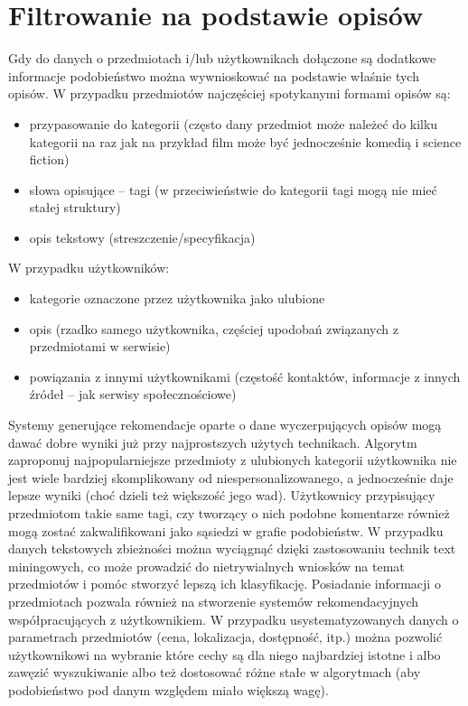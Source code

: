 \documentclass{pracamgr}
\begin{document}
  \section{Filtrowanie na podstawie opisów}
   Gdy do danych o przedmiotach i/lub użytkownikach dołączone są dodatkowe informacje podobieństwo
   można wywnioskować na podstawie właśnie tych opisów.\newline
   W przypadku przedmiotów najczęściej spotykanymi formami opisów są:
   \begin{itemize}\itemsep1pt \parskip0pt 
    \item przypasowanie do kategorii
     (często dany przedmiot może należeć do kilku kategorii na raz jak na przykład film może być jednocześnie komedią i science fiction)
    \item słowa opisujące -- tagi (w przeciwieństwie do kategorii tagi mogą nie mieć stałej struktury)
    \item opis tekstowy (streszczenie/specyfikacja)
   \end{itemize}
   W przypadku użytkowników:
   \begin{itemize}\itemsep1pt \parskip0pt 
    \item kategorie oznaczone przez użytkownika jako ulubione
    \item opis (rzadko samego użytkownika, częściej upodobań związanych z przedmiotami w serwisie)
    \item powiązania z innymi użytkownikami (częstość kontaktów, informacje z innych źródeł -- jak serwisy społecznościowe)
   \end{itemize}
   Systemy generujące rekomendacje oparte o dane wyczerpujących opisów mogą dawać dobre wyniki już przy najprostszych użytych technikach.
   Algorytm zaproponuj najpopularniejsze przedmioty z ulubionych kategorii użytkownika nie jest wiele bardziej skomplikowany od niespersonalizowanego,
   a jednocześnie daje lepsze wyniki (choć dzieli też większość jego wad).
   Użytkownicy przypisujący przedmiotom takie same tagi, czy tworzący o
   nich podobne komentarze również mogą zostać zakwalifikowani jako sąsiedzi w grafie podobieństw.
   W przypadku danych tekstowych zbieżności można wyciągnąć dzięki zastosowaniu technik text miningowych,
   co może prowadzić do nietrywialnych wniosków na temat przedmiotów i pomóc stworzyć lepszą ich klasyfikację.\newline
   Posiadanie informacji o przedmiotach pozwala również na stworzenie systemów rekomendacyjnych współpracujących z użytkownikiem.
   W przypadku usystematyzowanych danych o parametrach przedmiotów (cena, lokalizacja, dostępność, itp.)
   można pozwolić użytkownikowi na wybranie które cechy są dla niego najbardziej istotne i albo zawęzić wyszukiwanie albo też
   dostosować różne stałe w algorytmach (aby podobieństwo pod danym względem miało większą wagę).
\end{document}
